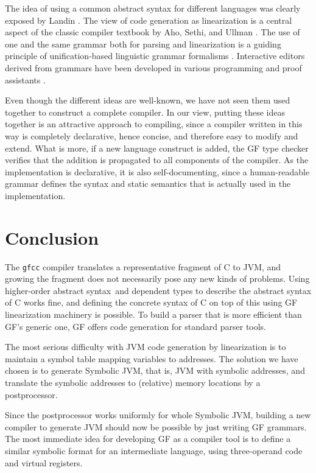 \documentclass[12pt]{article}
\newcommand{\HOAS}{higher-order abstract syntax}
\begin{document}
The idea of using a common abstract syntax for different 
languages was clearly exposed by Landin \cite{landin}. The view of
code generation as linearization is a central aspect of
the classic compiler textbook by Aho, Sethi, and Ullman
\cite{aho-ullman}. 
The use of one and the same grammar both for parsing and linearization
is a guiding principle of unification-based linguistic grammar 
formalisms \cite{pereira-shieber}. Interactive editors derived from
grammars have been developed in various programming and proof
assistants \cite{teitelbaum,metal,magnusson-nordstr}.

Even though the different ideas are well-known, 
we have not seen them used together to construct a complete
compiler. In our view, putting these ideas together is
an attractive approach to compiling, since a compiler written
in this way is completely declarative, hence concise, 
and therefore easy to modify and extend. What is more, if
a new language construct is added, the GF type checker
verifies that the addition is propagated to all components
of the compiler. As the implementation is declarative, 
it is also self-documenting, since a human-readable 
grammar defines the syntax and static
semantics that is actually used in the implementation.


\section{Conclusion}

The \texttt{gfcc} compiler translates a representative 
fragment of C to JVM, and growing the fragment
does not necessarily pose any new kinds of problems. 
Using \HOAS\ and dependent types to describe the abstract
syntax of C works fine, and defining the concrete syntax
of C on top of this using GF linearization machinery is 
possible. To build a parser that is more efficient than
GF's generic one, GF offers code generation for standard 
parser tools.

The most serious difficulty with JVM code generation by linearization
is to maintain a symbol table mapping variables to addresses.
The solution we have chosen is to generate Symbolic JVM, that is,
JVM with symbolic addresses, and translate the symbolic addresses to
(relative) memory locations by a postprocessor. 

Since the postprocessor works uniformly for whole Symbolic JVM,
building a new compiler to generate JVM should now be 
possible by just writing GF grammars. The most immediate
idea for developing GF as a compiler tool is to define
a similar symbolic format for an intermediate language,
using three-operand code and virtual registers.
\end{document}
